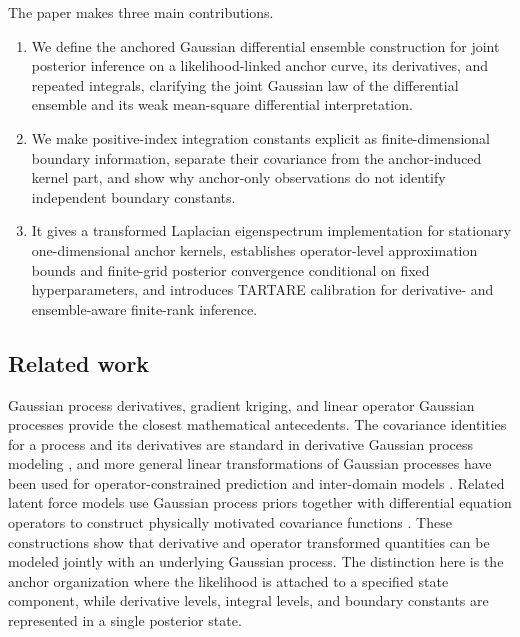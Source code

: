 \documentclass[11pt,a4paper]{article}
\theoremstyle{definition}
\theoremstyle{remark}
\begin{document}
The paper makes three main contributions.
\begin{enumerate}[label=(\arabic*)]
\item We define the anchored Gaussian differential ensemble construction for joint posterior inference on a likelihood-linked anchor curve, its derivatives, and repeated integrals, clarifying the joint Gaussian law of the differential ensemble and its weak mean-square differential interpretation.
\item We make positive-index integration constants explicit as finite-dimensional boundary information, separate their covariance from the anchor-induced kernel part, and show why anchor-only observations do not identify independent boundary constants.
\item It gives a transformed Laplacian eigenspectrum implementation for stationary one-dimensional anchor kernels, establishes operator-level approximation bounds and finite-grid posterior convergence conditional on fixed hyperparameters, and introduces TARTARE calibration for derivative- and ensemble-aware finite-rank inference.
\end{enumerate}

\subsection{Related work}\label{subsec:related-work}

Gaussian process derivatives, gradient kriging, and linear operator Gaussian processes provide the closest mathematical antecedents.  The covariance identities for a process and its derivatives are standard in derivative Gaussian process modeling \citep{solak2002derivative}, and more general linear transformations of Gaussian processes have been used for operator-constrained prediction and inter-domain models \citep{graepel2003solving,murraysmith2005transformations,lazaro2009interdomain,sarkka2011linear}. Related latent force models use Gaussian process priors together with differential equation operators to construct physically motivated covariance functions \citep{alvarez2013linear}.  These constructions show that derivative and operator transformed quantities can be modeled jointly with an underlying Gaussian process.  The distinction here is the anchor organization where the likelihood is attached to a specified state component, while derivative levels, integral levels, and boundary constants are represented in a single posterior state.
\end{document}
